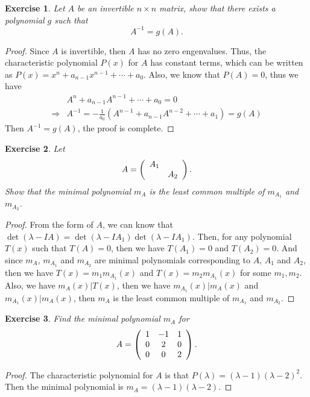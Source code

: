 \documentclass[11pt]{book}
\newtheorem{exercise}{Exercise}[section]
\theoremstyle{definition}
\numberwithin{equation}{chapter}
\begin{document}
\begin{exercise}
Let $A$ be an invertible $n\times n$ matrix, show that there exists a
polynomial $g$ such that
$$
A^{-1}=g\left(A\right).
$$
\end{exercise}
\begin{proof}
Since $A$ is invertible, then $A$ has no zero engenvalues. Thus, the characteristic polynomial $P(x)$ for $A$ has constant terms, which can be written as $P(x)= x^n + a_{n-1} x^{n-1} + \cdots + a_0$. Also, we know that $P(A)=0$, thus we have
\begin{align*}
    & A^n + a_{n-1} A^{n-1} + \cdots + a_0 = 0 \\
    \Rightarrow & A^{-1} = -\frac{1}{a_0}(A^{n-1}+a_{n-1}A^{n-2}+\cdots+a_1) = g(A)
\end{align*}
Then $A^{-1}=g(A)$, the proof is complete. 
\end{proof}

\medskip

\begin{exercise}
Let
\begin{align*}
  A=\left(
    \begin{array}
    [c]{cc}%
    A_{1} & \\
    & A_{2}%
    \end{array}
    \right).  
\end{align*}
Show that the minimal polynomial $m_{A}$ is the least common multiple of
$m_{A_{1}}$ and $m_{A_{2}}$.
\end{exercise}
\begin{proof}
From the form of $A$, we can know that $\det(\lambda-IA)=\det(\lambda-IA_1)\det(\lambda-IA_1)$. Then, for any polynomial $T(x)$ such that $T(A)=0$, then we have $T(A_1)=0$ and $T(A_2)=0$. And since $m_A$, $m_{A_1}$ and $m_{A_2}$ are minimal polynomials corresponding to $A$, $A_1$ and $A_2$, then we have $T(x)=m_1 m_{A_1}(x)$ and $T(x)=m_2 m_{A_1}(x)$ for some $m_1, m_2$. Also, we have $m_A(x)|T(x)$, then we have $m_{A_1}(x)|m_A(x)$ and $m_{A_1}(x)|m_A(x)$, then $m_A$ is the least common multiple of $m_{A_{1}}$ and $m_{A_{2}}$.
\end{proof}

\medskip

\begin{exercise}
Find the minimal polynomial $m_{A}$ for%
$$
A=\left(
\begin{array}
[c]{ccc}%
1 & -1 & 1\\
0 & 2 & 0\\
0 & 0 & 2
\end{array}
\right)  .
$$
\end{exercise}
\begin{proof}
The characteristic polynomial for $A$ is that $P(\lambda)=(\lambda-1)(\lambda-2)^2$. Then the minimal polynomial is $m_A=(\lambda-1)(\lambda-2)$.
\end{proof}
\end{document}
